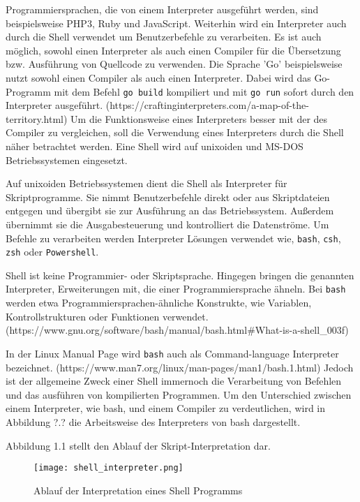 Programmiersprachen, die von einem Interpreter ausgeführt werden, sind beispielsweise PHP3, Ruby und JavaScript. Weiterhin wird ein Interpreter auch durch die Shell verwendet um Benutzerbefehle zu verarbeiten. Es ist auch möglich, sowohl einen Interpreter als auch einen Compiler für die Übersetzung bzw. Ausführung von Quellcode zu verwenden. Die Sprache 'Go' beispielsweise nutzt sowohl einen Compiler als auch einen Interpreter. Dabei wird das Go-Programm mit dem Befehl \verb+go build+ kompiliert und mit \verb+go run+ sofort durch den Interpreter ausgeführt. (https://craftinginterpreters.com/a-map-of-the-territory.html)
Um die Funktionsweise eines Interpreters besser mit der des Compiler zu vergleichen, soll die Verwendung eines Interpreters durch die Shell näher betrachtet werden. Eine Shell wird auf unixoiden und MS-DOS Betriebssystemen eingesetzt.
  
Auf unixoiden Betriebssystemen dient die Shell als Interpreter für Skriptprogramme. Sie nimmt Benutzerbefehle direkt oder aus Skriptdateien entgegen und übergibt sie zur Ausführung an das Betriebssystem. Außerdem übernimmt sie die Ausgabesteuerung und kontrolliert die Datenströme. 
Um Befehle zu verarbeiten werden Interpreter Lösungen verwendet wie, \verb+bash+, \verb+csh+, \verb+zsh+ oder \verb+Powershell+.

Shell ist keine Programmier- oder Skriptsprache. Hingegen bringen die genannten Interpreter, Erweiterungen mit, die einer Programmiersprache ähneln. Bei \verb+bash+ werden etwa Programmiersprachen-ähnliche Konstrukte, wie Variablen, Kontrollstrukturen oder Funktionen verwendet. (https://www.gnu.org/software/bash/manual/bash.html#What-is-a-shell_003f)

In der Linux Manual Page wird \verb+bash+ auch als Command-language Interpreter bezeichnet. (https://www.man7.org/linux/man-pages/man1/bash.1.html)
Jedoch ist der allgemeine Zweck einer Shell immernoch die Verarbeitung von Befehlen und das ausführen von kompilierten Programmen.
Um den Unterschied zwischen einem Interpreter, wie bash, und einem Compiler zu verdeutlichen, wird in Abbildung ?.? die Arbeitsweise des Interpreters von bash dargestellt.

Abbildung 1.1 stellt den Ablauf der Skript-Interpretation dar.
\begin{figure}[h]
  \centering
  \caption{Ablauf der Interpretation eines Shell Programms}
  \texttt{[image: shell\_interpreter.png]}
  \label{fig:shell}
\end{figure}
\pagebreak

